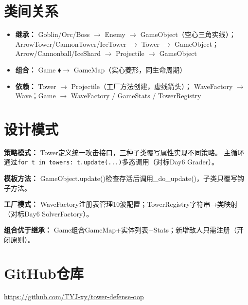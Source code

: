 \documentclass[9pt,a4paper]{ctexart}
\begin{document}
\section{类间关系}
\begin{itemize}
    \item \textbf{继承：} Goblin/Orc/Boss $\rightarrow$ Enemy $\rightarrow$ GameObject（空心三角实线）；
          ArrowTower/CannonTower/IceTower $\rightarrow$ Tower $\rightarrow$ GameObject；
          Arrow/Cannonball/IceShard $\rightarrow$ Projectile $\rightarrow$ GameObject
    \item \textbf{组合：} Game $\blacklozenge\rightarrow$ GameMap（实心菱形，同生命周期）
    \item \textbf{依赖：} Tower $\rightarrow$ Projectile（工厂方法创建，虚线箭头）；
          WaveFactory $\rightarrow$ Wave；Game $\rightarrow$ WaveFactory / GameStats / TowerRegistry
\end{itemize}

\section{设计模式}
\textbf{策略模式：} Tower定义统一攻击接口，三种子类覆写属性实现不同策略。
主循环通过\texttt{for t in towers: t.update(...)}多态调用（对标Day6 Grader）。

\textbf{模板方法：} GameObject.update()检查存活后调用\_do\_update()，子类只覆写钩子方法。

\textbf{工厂模式：} WaveFactory注册表管理10波配置；TowerRegistry字符串→类映射（对标Day6 SolverFactory）。

\textbf{组合优于继承：} Game组合GameMap+实体列表+Stats；新增敌人只需注册（开闭原则）。

\section{GitHub仓库}
\url{https://github.com/TYJ-xy/tower-defense-oop}
\end{document}
